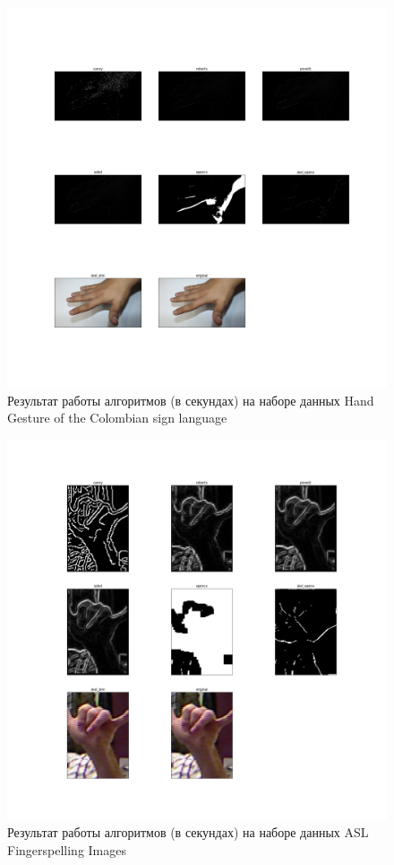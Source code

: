 \begin{figure}[!h]
	\centering
	\includegraphics[width=\textwidth,keepaspectratio]{figures/ru/coombian.jpg}
	\caption{Результат работы алгоритмов (в секундах) на наборе данных Hand Gesture of the Colombian sign language}
	\label{fig:colombian}
\end{figure}

\begin{figure}[!h]
	\centering
	\includegraphics[width=\textwidth,keepaspectratio]{figures/ru/asl2.jpg}
	\caption{Результат работы алгоритмов (в секундах) на наборе данных ASL Fingerspelling Images}
	\label{fig:asl2}
\end{figure}

